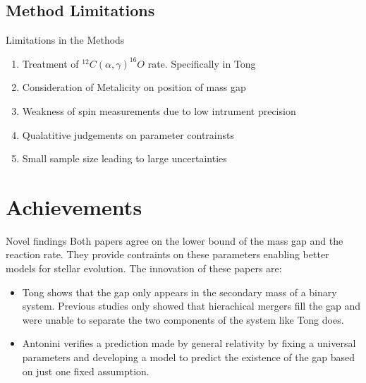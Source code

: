 \documentclass[aspectratio=169]{beamer}
\begin{document}
	\subsection{Method Limitations}

	\begin{frame}{Limitations in the Methods}
		\begin{enumerate}
			\item Treatment of $^{12}C(\alpha , \gamma)^{16}O$ rate. Specifically in Tong
			\item Consideration of Metalicity on position of mass gap
			\item Weakness of spin measurements due to low intrument precision
			\item Qualatitive judgements on parameter contrainsts
			\item Small sample size leading to large uncertainties
		\end{enumerate}
	\end{frame}

\section{Achievements}
\begin{frame}{Novel findings}
	Both papers agree on the lower bound of the mass gap and the reaction rate. They provide contraints on these parameters enabling better models for stellar evolution. The innovation of these papers are:
	\begin{itemize}
		\item Tong shows that the gap only appears in the secondary mass of a binary system. Previous studies only showed that hierachical mergers fill the gap and were unable to separate the two components of the system like Tong does.
		\item Antonini verifies a prediction made by general relativity by fixing a universal parameters and developing a model to predict the existence of the gap based on just one fixed assumption.
	\end{itemize}
\end{frame}
\end{document}
